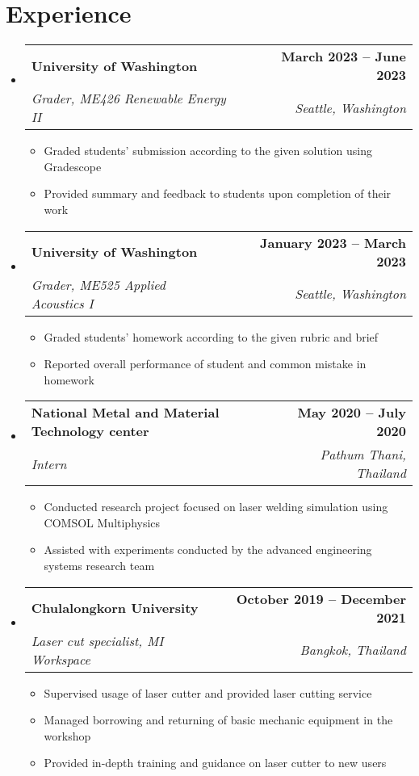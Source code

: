 \documentclass[letterpaper,11pt]{article}
\makeatletter
\newcommand{\resumeItem}[1]{
  \item\small{
    {#1 \vspace{-2pt}}
  }
}
\newcommand{\resumeSubheading}[4]{
  \vspace{-2pt}\item
    \begin{tabular*}{1.0\textwidth}[t]{l@{\extracolsep{\fill}}r}
      \textbf{#1} & \textbf{\small #2} \\
      \textit{\small#3} & \textit{\small #4} \\
    \end{tabular*}\vspace{-7pt}
}
\newcommand{\resumeSubHeadingListStart}{\begin{itemize}[leftmargin=0.0in, label={}]}
\newcommand{\resumeSubHeadingListEnd}{\end{itemize}}
\newcommand{\resumeItemListStart}{\begin{itemize}}
\newcommand{\resumeItemListEnd}{\end{itemize}\vspace{-5pt}}
\makeatother
\begin{document}
\section{Experience}
  \resumeSubHeadingListStart

    \resumeSubheading
      {University of Washington}{March 2023 -- June 2023}
      {Grader, ME426 Renewable Energy II}{Seattle, Washington}
      \resumeItemListStart
        \resumeItem{Graded students' submission according to the given solution using Gradescope}
        \resumeItem{Provided summary and feedback to students upon completion of their work}
        \resumeItemListEnd

    \resumeSubheading
      {University of Washington}{January 2023 -- March 2023}
      {Grader, ME525 Applied Acoustics I}{Seattle, Washington}
      \resumeItemListStart
        \resumeItem{Graded students' homework according to the given rubric and brief}
        \resumeItem{Reported overall performance of student and common mistake in homework}
    \resumeItemListEnd
    
    \resumeSubheading
      {National Metal and Material Technology center}{May 2020 -- July 2020}
      {Intern}{Pathum Thani, Thailand}
      \resumeItemListStart
        \resumeItem{Conducted research project focused on laser welding simulation using COMSOL Multiphysics\textsuperscript{\textregistered}}
        \resumeItem{Assisted with experiments conducted by the advanced engineering systems research team}
    \resumeItemListEnd
    
    \resumeSubheading
      {Chulalongkorn University}{October 2019 -- December 2021}
      {Laser cut specialist, MI Workspace}{Bangkok, Thailand}
      \resumeItemListStart
        \resumeItem{Supervised usage of laser cutter and provided laser cutting service}
        \resumeItem{Managed borrowing and returning of basic mechanic equipment in the workshop}
        \resumeItem{Provided in-depth training and guidance on laser cutter to new users}
    \resumeItemListEnd
    
    
  \resumeSubHeadingListEnd
\vspace{-16pt}

\end{document}
